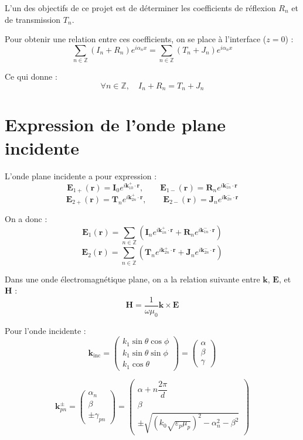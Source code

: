 \documentclass{article}
\begin{document}
\medskip

L’un des objectifs de ce projet est de déterminer les coefficients de réflexion \( R_n \) et de transmission \( T_n \).

Pour obtenir une relation entre ces coefficients, on se place à l'interface ($z = 0$) :
\[
\sum_{n \in \mathbb{Z}} \left( I_n + R_n \right) e^{i \alpha_n x}
=
\sum_{n \in \mathbb{Z}} \left( T_n + J_n \right) e^{i \alpha_n x}
\]

Ce qui donne :
\[
\forall n \in \mathbb{Z}, \quad I_n + R_n = T_n + J_n
\]

\section*{Expression de l’onde plane incidente}

L’onde plane incidente a pour expression :
\[
\mathbf{E}_{1+}(\mathbf{r}) = \mathbf{I}_0 e^{i \mathbf{k}_{10}^{+} \cdot \mathbf{r}}, \qquad
\mathbf{E}_{1-}(\mathbf{r}) = \mathbf{R}_n e^{i \mathbf{k}_{1n}^{-} \cdot \mathbf{r}}
\]
\[
\mathbf{E}_{2+}(\mathbf{r}) = \mathbf{T}_n e^{i \mathbf{k}_{2n}^{+} \cdot \mathbf{r}}, \qquad
\mathbf{E}_{2-}(\mathbf{r}) = \mathbf{J}_n e^{i \mathbf{k}_{2n}^{-} \cdot \mathbf{r}}
\]

On a donc :
\[
\mathbf{E}_1(\mathbf{r}) = \sum_{n \in \mathbb{Z}} \left( \mathbf{I}_n e^{i \mathbf{k}_{1n}^{+} \cdot \mathbf{r}} + \mathbf{R}_n e^{i \mathbf{k}_{1n}^{-} \cdot \mathbf{r}} \right)
\]
\[
\mathbf{E}_2(\mathbf{r}) = \sum_{n \in \mathbb{Z}} \left( \mathbf{T}_n e^{i \mathbf{k}_{2n}^{+} \cdot \mathbf{r}} + \mathbf{J}_n e^{i \mathbf{k}_{2n}^{-} \cdot \mathbf{r}} \right)
\]

Dans une onde électromagnétique plane, on a la relation suivante entre $\mathbf{k}$, $\mathbf{E}$, et $\mathbf{H}$ :
\[
\mathbf{H} = \frac{1}{\omega \mu_0} \mathbf{k} \times \mathbf{E}
\]

\medskip

Pour l’onde incidente :
\[
\mathbf{k}_{\text{inc}} = 
\begin{pmatrix}
k_1 \sin\theta \cos\phi \\
k_1 \sin\theta \sin\phi \\
k_1 \cos\theta
\end{pmatrix}
=
\begin{pmatrix}
\alpha \\
\beta \\
\gamma
\end{pmatrix}
\]

\[
\mathbf{k}_{pn}^{\pm} =
\begin{pmatrix}
\alpha_n \\
\beta \\
\pm \gamma_{pn}
\end{pmatrix}
=
\begin{pmatrix}
\alpha + n \dfrac{2\pi}{d} \\
\beta \\
\pm \sqrt{\left(k_0 \sqrt{\varepsilon_p \mu_p}\right)^2 - \alpha_n^2 - \beta^2}
\end{pmatrix}
\]
\end{document}
